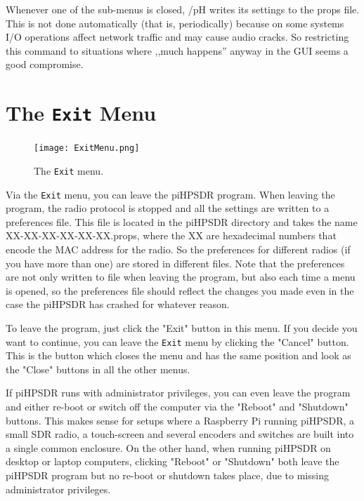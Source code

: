 \documentclass[12pt]{book}
\def\bltt#1{\texttt{\color{blue}#1}}
\def\pH{pi\-HPSDR\xspace}
\begin{document}
Whenever one of the sub-menus is closed, /pH writes its settings to the props file. This is not done
automatically (that is, periodically) because on some systems I/O operations affect
network traffic and may cause audio cracks. So restricting this command to situations
where ,,much happens'' anyway in the GUI seems a good compromise.
\section{The \texttt{Exit} Menu}

\begin{figure}[ht]
\center
\texttt{[image: ExitMenu.png]}
\caption{The \bltt{Exit} menu.}
\end{figure}

Via the \bltt{Exit} menu, you can leave the \pH program. When leaving the program,
the radio protocol is stopped and all the settings are written to a preferences file. This
file is located in the \pH directory and takes the name XX-XX-XX-XX-XX-XX.props, where
the XX are hexadecimal numbers that encode the MAC address for the radio.
So the preferences for different radios (if you
have more than one) are stored in different files.
Note that the preferences are not only written to file when leaving the program, but also each
time a menu is opened, so the preferences file should reflect the changes you made even in the
case the \pH has crashed for whatever reason.

To leave the program, just click the
"Exit" button in this menu. If you decide you want to continue, you can leave the \bltt{Exit}
menu by clicking the "Cancel" button. This is the button which closes the menu and has
the same position and look as the "Close" buttons in all the other menus.

If \pH runs with administrator privileges, you can even leave the program and either re-boot
or switch off the computer via the "Reboot" and "Shutdown" buttons. This makes sense for setups
where a Raspberry Pi running \pH, a small SDR radio, a touch-screen and several encoders
and switches are built into a single common enclosure. On the other hand, when running
\pH on desktop or laptop computers, clicking "Reboot" or "Shutdown" both leave the \pH
program but no re-boot or shutdown takes place, due to missing administrator privileges.

\clearpage
\end{document}

